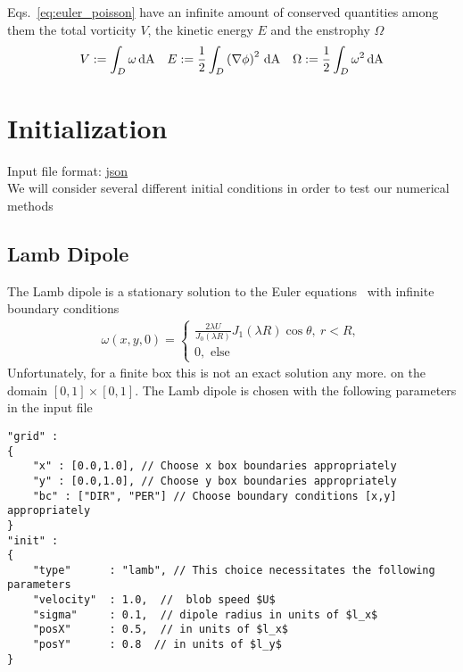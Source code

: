 Eqs.~\eqref{eq:euler_poisson} have an infinite amount of conserved quantities
among them the total vorticity $V$, the kinetic energy $E$ and the enstrophy $\Omega$
 \begin{align}
     V := \int_D \omega \,\mathrm{dA}\quad
     E :=\frac{1}{2} \int_D \left( \nabla \phi\right)^2 \,\mathrm{dA} \quad
     \Omega:= \frac{1}{2} \int_D \omega^2 \,\mathrm{dA}
 \end{align}


\section{Initialization}
Input file format: \href{https://en.wikipedia.org/wiki/JSON}{json} \\
We will consider several different initial conditions in order to test
our numerical methods
\subsection{Lamb Dipole}
The Lamb dipole is a stationary solution to the Euler equations~\cite{Nielsen1997} with infinite
boundary conditions
\begin{align}
    \omega(x,y,0) = \begin{cases}
        \frac{2\lambda U}{J_0(\lambda R)} J_1(\lambda R) \cos \theta,\ r < R,\\
        0, \text{ else}
    \end{cases}
\end{align}
Unfortunately, for a finite box this is not an exact solution any more.
on the domain $[0,1]\times [0,1]$.
The Lamb dipole is chosen with the following parameters in the input file
\begin{verbatim}
"grid" :
{
    "x" : [0.0,1.0], // Choose x box boundaries appropriately
    "y" : [0.0,1.0], // Choose y box boundaries appropriately
    "bc" : ["DIR", "PER"] // Choose boundary conditions [x,y] appropriately
}
"init" :
{
    "type"      : "lamb", // This choice necessitates the following parameters
    "velocity"  : 1.0,  //  blob speed $U$
    "sigma"     : 0.1,  // dipole radius in units of $l_x$
    "posX"      : 0.5,  // in units of $l_x$
    "posY"      : 0.8  // in units of $l_y$
}
\end{verbatim}

